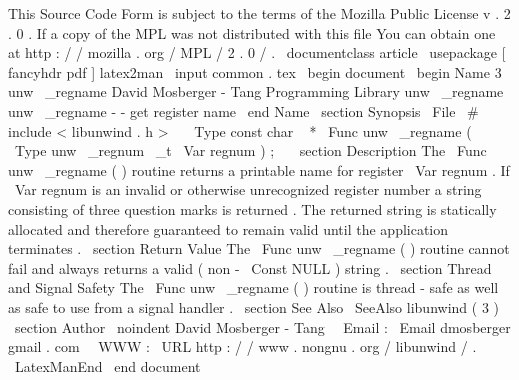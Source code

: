 %
This
Source
Code
Form
is
subject
to
the
terms
of
the
Mozilla
Public
%
License
v
.
2
.
0
.
If
a
copy
of
the
MPL
was
not
distributed
with
this
%
file
You
can
obtain
one
at
http
:
/
/
mozilla
.
org
/
MPL
/
2
.
0
/
.
\
documentclass
{
article
}
\
usepackage
[
fancyhdr
pdf
]
{
latex2man
}
\
input
{
common
.
tex
}
\
begin
{
document
}
\
begin
{
Name
}
{
3
}
{
unw
\
_regname
}
{
David
Mosberger
-
Tang
}
{
Programming
Library
}
{
unw
\
_regname
}
unw
\
_regname
-
-
get
register
name
\
end
{
Name
}
\
section
{
Synopsis
}
\
File
{
\
#
include
<
libunwind
.
h
>
}
\
\
\
Type
{
const
char
~
*
}
\
Func
{
unw
\
_regname
}
(
\
Type
{
unw
\
_regnum
\
_t
}
\
Var
{
regnum
}
)
;
\
\
\
section
{
Description
}
The
\
Func
{
unw
\
_regname
}
(
)
routine
returns
a
printable
name
for
register
\
Var
{
regnum
}
.
If
\
Var
{
regnum
}
is
an
invalid
or
otherwise
unrecognized
register
number
a
string
consisting
of
three
question
marks
is
returned
.
The
returned
string
is
statically
allocated
and
therefore
guaranteed
to
remain
valid
until
the
application
terminates
.
\
section
{
Return
Value
}
The
\
Func
{
unw
\
_regname
}
(
)
routine
cannot
fail
and
always
returns
a
valid
(
non
-
\
Const
{
NULL
}
)
string
.
\
section
{
Thread
and
Signal
Safety
}
The
\
Func
{
unw
\
_regname
}
(
)
routine
is
thread
-
safe
as
well
as
safe
to
use
from
a
signal
handler
.
\
section
{
See
Also
}
\
SeeAlso
{
libunwind
(
3
)
}
\
section
{
Author
}
\
noindent
David
Mosberger
-
Tang
\
\
Email
:
\
Email
{
dmosberger
gmail
.
com
}
\
\
WWW
:
\
URL
{
http
:
/
/
www
.
nongnu
.
org
/
libunwind
/
}
.
\
LatexManEnd
\
end
{
document
}
